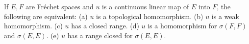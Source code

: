 If $E, F$ are Fréchet spaces and $u$ is a continuous linear map of $E$ into $F$, the following are equivalent: (a) $u$ is a topological homomorphism. (b) $u$ is a weak homomorphism. (c) $u$ has a closed range. (d) $u$ is a homomorphism for $\sigma(F, F)$ and $\sigma(E, E)$. (e) $u$ has a range closed for $\sigma(E, E)$.